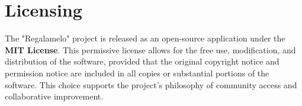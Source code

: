 \section{Licensing}
The "Regalamelo" project is released as an open-source application under the \textbf{MIT License}. This permissive license allows for the free use, modification, and distribution of the software, provided that the original copyright notice and permission notice are included in all copies or substantial portions of the software. This choice supports the project's philosophy of community access and collaborative improvement.